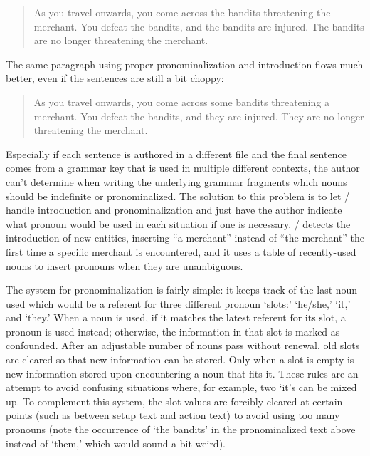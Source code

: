 \begin{quote}
  As you travel onwards, you come across the bandits threatening the merchant. You defeat the bandits, and the bandits are injured. The bandits are no longer threatening the merchant.
\end{quote}

The same paragraph using proper pronominalization and introduction flows much better, even if the sentences are still a bit choppy:

\begin{quote}
  As you travel onwards, you come across some bandits threatening a merchant. You defeat the bandits, and they are injured. They are no longer threatening the merchant.
\end{quote}

Especially if each sentence is authored in a different file and the final sentence comes from a grammar key that is used in multiple different contexts, the author can't determine when writing the underlying grammar fragments which nouns should be indefinite or pronominalized.
%
The solution to this problem is to let \dunyazad/ handle introduction and pronominalization and just have the author indicate what pronoun would be used in each situation if one is necessary.
%
\dunyazad/ detects the introduction of new entities, inserting ``a merchant'' instead of ``the merchant'' the first time a specific merchant is encountered, and it uses a table of recently-used nouns to insert pronouns when they are unambiguous.


The system for pronominalization is fairly simple: it keeps track of the last noun used which would be a referent for three different pronoun `slots:' `he/she,' `it,' and `they.'
%
When a noun is used, if it matches the latest referent for its slot, a pronoun is used instead; otherwise, the information in that slot is marked as confounded.
%
After an adjustable number of nouns pass without renewal, old slots are cleared so that new information can be stored.
%
Only when a slot is empty is new information stored upon encountering a noun that fits it.
%
These rules are an attempt to avoid confusing situations where, for example, two `it's can be mixed up.
%
To complement this system, the slot values are forcibly cleared at certain points (such as between setup text and action text) to avoid using too many pronouns (note the occurrence of `the bandits' in the pronominalized text above instead of `them,' which would sound a bit weird).



